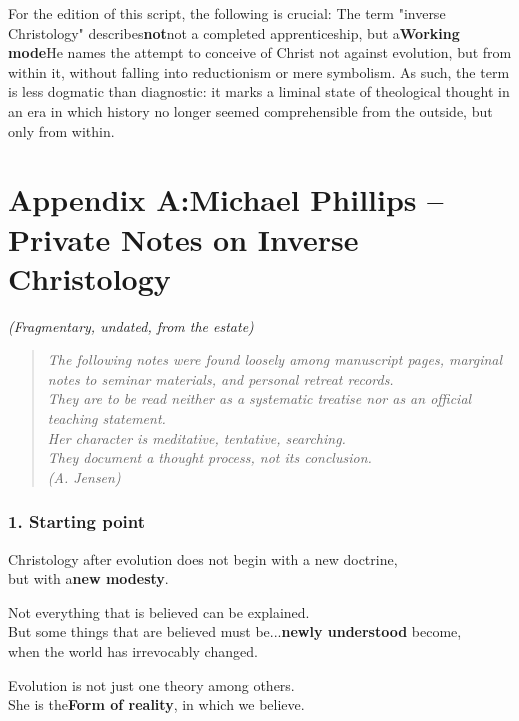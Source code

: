 \documentclass[
]{article}
\begin{document}
For the edition of this script, the following is crucial: The term "inverse Christology" describes\textbf{not}not a completed apprenticeship, but a\textbf{Working mode}He names the attempt to conceive of Christ not against evolution, but from within it, without falling into reductionism or mere symbolism. As such, the term is less dogmatic than diagnostic: it marks a liminal state of theological thought in an era in which history no longer seemed comprehensible from the outside, but only from within.

\section{\texorpdfstring{Appendix A:\textbf{Michael Phillips -- Private Notes on Inverse Christology}}{Appendix A:Michael Phillips -- Private Notes on Inverse Christology}}\label{appendix-amichael-phillips-private-notes-on-inverse-christology}

\emph{(Fragmentary, undated, from the estate)}

\begin{quote}
\emph{The following notes were found loosely among manuscript pages, marginal notes to seminar materials, and personal retreat records.\\
They are to be read neither as a systematic treatise nor as an official teaching statement.\\
Her character is meditative, tentative, searching.\\
They document a thought process, not its conclusion.\\
(A. Jensen)}
\end{quote}

\subsubsection{\texorpdfstring{\textbf{1. Starting point}}{1. Starting point}}\label{starting-point}

Christology after evolution does not begin with a new doctrine,\\
but with a\textbf{new modesty}.

Not everything that is believed can be explained.\\
But some things that are believed must be...\textbf{newly understood} become,\\
when the world has irrevocably changed.

Evolution is not just one theory among others.\\
She is the\textbf{Form of reality}, in which we believe.
\end{document}
